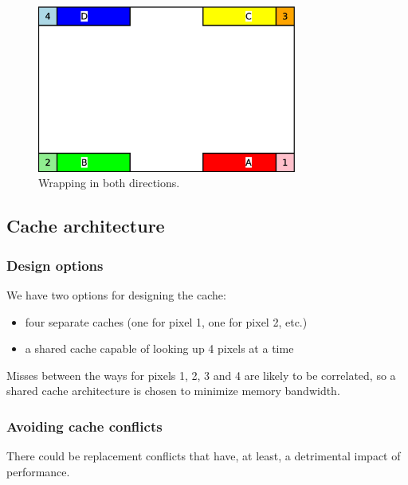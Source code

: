 \documentclass[a4paper,11pt]{article}
\begin{document}
\begin{figure}[H]
\centering
\includegraphics[height=55mm]{dist_wrap3.eps}
\caption{Wrapping in both directions.}\label{fig:casewrap3}
\end{figure}

\subsection{Cache architecture}
\subsubsection{Design options}
We have two options for designing the cache:
\begin{itemize}
\item four separate caches (one for pixel 1, one for pixel 2, etc.)
\item a shared cache capable of looking up 4 pixels at a time
\end{itemize}

Misses between the ways for pixels 1, 2, 3 and 4 are likely to be correlated, so a shared cache architecture is chosen to minimize memory bandwidth.

\subsubsection{Avoiding cache conflicts}
There could be replacement conflicts that have, at least, a detrimental impact of performance.
\end{document}
